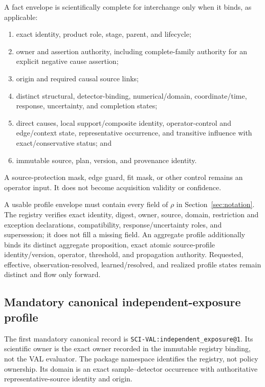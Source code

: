 A fact envelope is scientifically complete for interchange only when it
binds, as applicable:
\begin{enumerate}
  \item exact identity, product role, stage, parent, and lifecycle;
  \item owner and assertion authority, including complete-family authority
        for an explicit negative cause assertion;
  \item origin and required causal source links;
  \item distinct structural, detector-binding, numerical/domain,
        coordinate/time, response, uncertainty, and completion states;
  \item direct causes, local support/composite identity, operator-control and
        edge/context state, representative occurrence, and transitive
        influence with exact/conservative status; and
  \item immutable source, plan, version, and provenance identity.
\end{enumerate}
A source-protection mask, edge guard, fit mask, or other control remains an
operator input. It does not become acquisition validity or confidence.

A usable profile envelope must contain every field of $\rho$ in
Section~\ref{sec:notation}. The registry verifies exact identity, digest,
owner, source, domain, restriction and exception declarations, compatibility,
response/uncertainty roles, and supersession; it does not fill a missing
field. An aggregate profile additionally binds its distinct aggregate
proposition, exact atomic source-profile identity/version, operator,
threshold, and propagation authority. Requested, effective,
observation-resolved, learned/resolved, and realized profile states remain
distinct and flow only forward.

\subsection{Mandatory canonical independent-exposure profile}
\label{sec:independent-profile}

The first mandatory canonical record is
\texttt{SCI-VAL:independent\_exposure@1}. Its scientific owner is the exact
owner recorded in the immutable registry binding, not the VAL evaluator. The
package namespace identifies the registry, not policy ownership. Its domain
is an exact sample--detector occurrence with authoritative
representative-source identity and origin.

